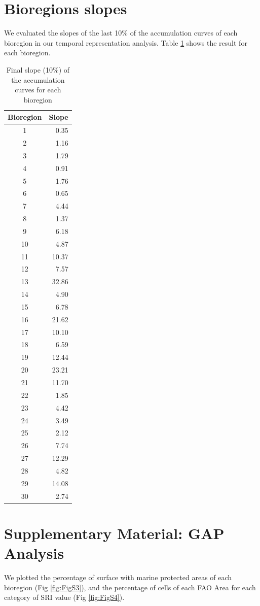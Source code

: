 \documentclass[12pt,authoryear]{elsarticle}
\begin{document}
\section{Bioregions slopes}
We evaluated the slopes of the last 10\% of the accumulation curves of each bioregion in our temporal representation analysis. Table \ref{tab:slope} shows the result for each bioregion.

\begin{table}[h]
\centering
\begin{tabular}{| c | r |}
  \hline
\textbf{Bioregion} & \textbf{Slope} \\ 
  \hline
1 & 0.35 \\ 
2 & 1.16 \\ 
3 & 1.79 \\ 
4 & 0.91 \\ 
5 & 1.76 \\ 
6 & 0.65 \\ 
7 & 4.44 \\ 
8 & 1.37 \\ 
9 & 6.18 \\ 
10 & 4.87 \\ 
11 & 10.37 \\ 
12 & 7.57 \\ 
13 & 32.86 \\ 
14 & 4.90 \\ 
15 & 6.78 \\ 
16 & 21.62 \\ 
17 & 10.10 \\ 
18 & 6.59 \\ 
19 & 12.44 \\ 
20 & 23.21 \\ 
21 & 11.70 \\ 
22 & 1.85 \\ 
23 & 4.42 \\ 
24 & 3.49 \\ 
25 & 2.12 \\ 
26 & 7.74 \\ 
27 & 12.29 \\ 
28 & 4.82 \\ 
29 & 14.08 \\ 
30 & 2.74 \\ 
   \hline
\end{tabular}
\caption{Final slope (10$\%$) of the accumulation curves for each bioregion}
\label{tab:slope}
\end{table}

\section{Supplementary Material: GAP Analysis}
We plotted the percentage of surface with marine protected areas of each bioregion (Fig \ref{fig:FigS3}), and the percentage of cells of each FAO Area for each category of SRI value (Fig \ref{fig:FigS4}).
\end{document}
